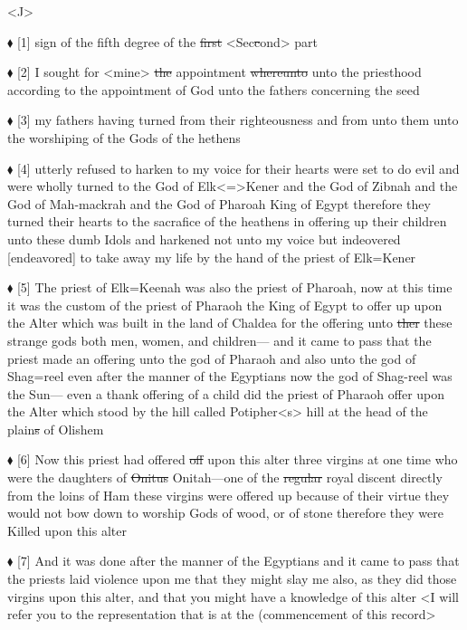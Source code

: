 				\begin{tightright}
				<J>
				\end{tightright}

				$\blacklozenge$ [1]	sign of the fifth degree of the \sout{first} <Sec\sout{c}ond> part

				$\blacklozenge$ [2]	I sought for <mine> \sout{the} appointment \sout{whereunto} unto the priesthood according to the appointment of God unto the fathers concerning the seed

				$\blacklozenge$ [3]	my fathers having turned from their righteousness and from unto them unto the worshiping of the Gods of the hethens

				$\blacklozenge$ [4]	utterly refused to harken to my voice for their hearts were set to do evil and were wholly turned to the God of Elk<=>Kener and the God of Zibnah and the God of Mah-mackrah and the God of Pharoah King of Egypt therefore they turned their hearts to the sacrafice of the heathens in offering up their children unto these dumb Idols and harkened not unto my voice but indeovered [endeavored] to take away my life by the hand of the priest of Elk=Kener

				$\blacklozenge$ [5]	The priest of Elk=Keenah was also the priest of Pharoah, now at this time it was the custom of the priest of Pharaoh the King of Egypt to offer up upon the Alter which was built in the land of Chaldea for the offering unto \sout{ther} these strange gods both men, women, and children--- and it came to pass that the priest made an offering unto the god of Pharaoh and also unto the god of Shag=reel even after the manner of the Egyptians now the god of Shag-reel was the Sun--- even a thank offering of a child did the priest of Pharaoh offer upon the Alter which stood by the hill called Potipher<s> hill at the head of the plain\sout{s} of Olishem

				$\blacklozenge$ [6]	Now this priest had offered \sout{off} upon this alter three virgins at one time who were the daughters of \sout{Onitus} Onitah---one of the \sout{regular} royal discent directly from the loins of Ham these virgins were offered up because of their virtue they would not bow down to worship Gods of wood, or of stone therefore they were Killed upon this alter

				$\blacklozenge$ [7]	And it was done after the manner of the Egyptians and it came to pass that the priests laid violence upon me that they might slay me also, as they did those virgins upon this alter, and that you might have a knowledge of this alter <I will refer you to the representation that is at the (commencement of this record>

